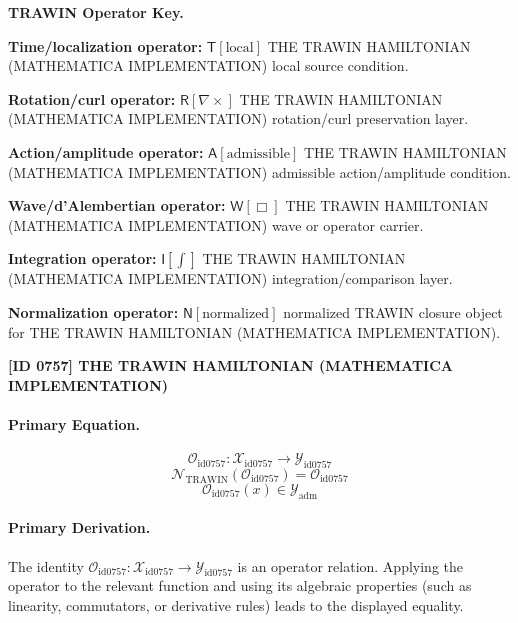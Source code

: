 \par\vspace{0.45\baselineskip}
\noindent\begin{minipage}[t]{\linewidth}
\begingroup
\small
\raggedright
\textbf{TRAWIN Operator Key.}\par
\noindent\textbf{Time/localization operator:} $\mathsf{T}\!\left[\mathrm{local}\right]$ THE TRAWIN HAMILTONIAN (MATHEMATICA IMPLEMENTATION) local source condition.\par
\noindent\textbf{Rotation/curl operator:} $\mathsf{R}\!\left[\nabla\times\right]$ THE TRAWIN HAMILTONIAN (MATHEMATICA IMPLEMENTATION) rotation/curl preservation layer.\par
\noindent\textbf{Action/amplitude operator:} $\mathsf{A}\!\left[\mathrm{admissible}\right]$ THE TRAWIN HAMILTONIAN (MATHEMATICA IMPLEMENTATION) admissible action/amplitude condition.\par
\noindent\textbf{Wave/d'Alembertian operator:} $\mathsf{W}\!\left[\Box\right]$ THE TRAWIN HAMILTONIAN (MATHEMATICA IMPLEMENTATION) wave or operator carrier.\par
\noindent\textbf{Integration operator:} $\mathsf{I}\!\left[\int\right]$ THE TRAWIN HAMILTONIAN (MATHEMATICA IMPLEMENTATION) integration/comparison layer.\par
\noindent\textbf{Normalization operator:} $\mathsf{N}\!\left[\mathrm{normalized}\right]$ normalized TRAWIN closure object for THE TRAWIN HAMILTONIAN (MATHEMATICA IMPLEMENTATION).\par
\endgroup
\end{minipage}

\clearpage
\noindent\textbf{[ID 0757] THE TRAWIN HAMILTONIAN (MATHEMATICA IMPLEMENTATION)}\par
\vspace{0.35em}
\paragraph{Primary Equation.}
\[
\mathcal{O}_{\mathrm{id0757}}:\mathcal{X}_{\mathrm{id0757}}\longrightarrow\mathcal{Y}_{\mathrm{id0757}}
\]
\[
\mathcal{N}_{\mathrm{TRAWIN}}(\mathcal{O}_{\mathrm{id0757}})=\mathcal{O}_{\mathrm{id0757}}
\]
\[
\mathcal{O}_{\mathrm{id0757}}(x)\in\mathcal{Y}_{\mathrm{adm}}
\]

\paragraph{Primary Derivation.}
The identity \( \mathcal{O}_{\mathrm{id0757}}:\mathcal{X}_{\mathrm{id0757}}\longrightarrow\mathcal{Y}_{\mathrm{id0757}} \) is an operator relation. Applying the operator to the relevant function and using its algebraic properties (such as linearity, commutators, or derivative rules) leads to the displayed equality.
